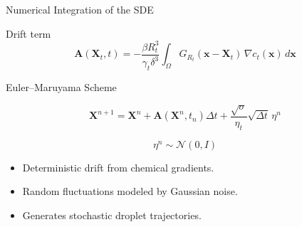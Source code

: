 \begin{frame}{Numerical Integration of the SDE}
	\begin{block}{Drift term}
		\[
			\mathbf{A}(\mathbf{X}_t,t)
			=
			-\frac{\beta R_t^3}{\gamma_t\delta^3}
			\int_{\Omega}
			G_{R_t}(\mathbf{x}-\mathbf{X}_t)\,
			\nabla c_t(\mathbf{x})\,d\mathbf{x}
		\]
	\end{block}

	\begin{block}{Euler--Maruyama Scheme}

		\[
			\mathbf X^{n+1}
			=
			\mathbf X^{n}
			+
			\mathbf A(\mathbf X^n,t_n)\Delta t
			+
			\frac{\sqrt{\sigma}}{\eta_t}
			\sqrt{\Delta t}\,
			\eta^n
		\]

		\[
			\eta^n \sim \mathcal N(0,I)
		\]

	\end{block}

	\begin{itemize}
		\item Deterministic drift from chemical gradients.
		\item Random fluctuations modeled by Gaussian noise.
		\item Generates stochastic droplet trajectories.
	\end{itemize}

\end{frame}
